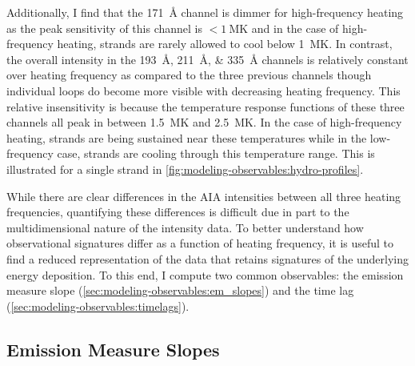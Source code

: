 Additionally, I find that the \SI{171}{\angstrom} channel is dimmer for high-frequency heating as the peak sensitivity of this channel is $<\SI{1}{\mega\kelvin}$ and in the case of high-frequency heating, strands are rarely allowed to cool below \SI{1}{\mega\kelvin}. In contrast, the overall intensity in the \SIlist{193;211;335}{\angstrom} channels is relatively constant over heating frequency as compared to the three previous channels though individual loops do become more visible with decreasing heating frequency. This relative insensitivity is because the temperature response functions of these three channels all peak in between \SI{1.5}{\mega\kelvin} and \SI{2.5}{\mega\kelvin}. In the case of high-frequency heating, strands are being sustained near these temperatures while in the low-frequency case, strands are cooling through this temperature range. This is illustrated for a single strand in \autoref{fig:modeling-observables:hydro-profiles}.

While there are clear differences in the AIA intensities between all three heating frequencies, quantifying these differences is difficult due in part to the multidimensional nature of the intensity data. To better understand how observational signatures differ as a function of heating frequency, it is useful to find a reduced representation of the data that retains signatures of the underlying energy deposition. To this end, I compute two common observables: the emission measure slope (\autoref{sec:modeling-observables:em_slopes}) and the time lag (\autoref{sec:modeling-observables:timelags}).

\subsection{Emission Measure Slopes}\label{sec:modeling-observables:em_slopes}

